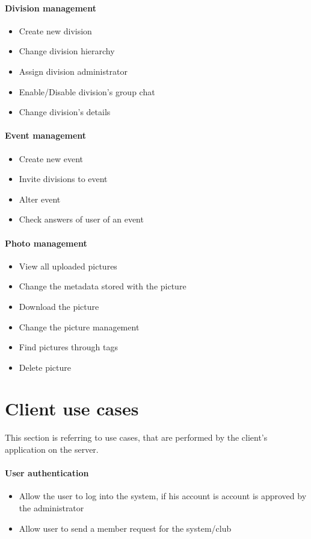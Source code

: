 \paragraph{Division management}
\begin{itemize}
\item Create new division
\item Change division hierarchy
\item Assign division administrator
\item Enable/Disable division's group chat
\item Change division's details
\end{itemize}

\paragraph{Event management}
\begin{itemize}
\item Create new event
\item Invite divisions to event
\item Alter event
\item Check answers of user of an event
\end{itemize}

\paragraph{Photo management}
\begin{itemize}
\item View all uploaded pictures
\item Change the metadata stored with the picture
\item Download the picture
\item Change the picture management
\item Find pictures through tags
\item Delete picture
\end{itemize}

\section{Client use cases}
This section is referring to use cases, that are performed by the client's application on the server.

\paragraph{User authentication}
\begin{itemize}
\item Allow the user to log into the system, if his account is account is approved by the administrator
\item Allow user to send a member request for the system/club
\end{itemize}

